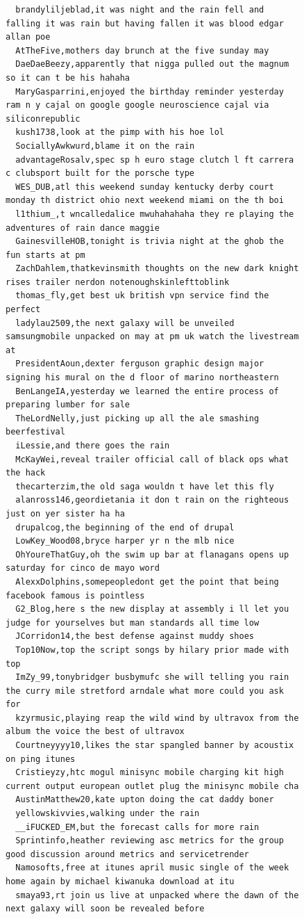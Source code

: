\begin{figure}[htpb]
\begin{verbatim}
  brandyliljeblad,it was night and the rain fell and falling it was rain but having fallen it was blood edgar allan poe
  AtTheFive,mothers day brunch at the five sunday may
  DaeDaeBeezy,apparently that nigga pulled out the magnum so it can t be his hahaha
  MaryGasparrini,enjoyed the birthday reminder yesterday ram n y cajal on google google neuroscience cajal via siliconrepublic
  kush1738,look at the pimp with his hoe lol
  SociallyAwkwurd,blame it on the rain
  advantageRosalv,spec sp h euro stage clutch l ft carrera c clubsport built for the porsche type
  WES_DUB,atl this weekend sunday kentucky derby court monday th district ohio next weekend miami on the th boi
  l1thium_,t wncalledalice mwuhahahaha they re playing the adventures of rain dance maggie
  GainesvilleHOB,tonight is trivia night at the ghob the fun starts at pm
  ZachDahlem,thatkevinsmith thoughts on the new dark knight rises trailer nerdon notenoughskinlefttoblink
  thomas_fly,get best uk british vpn service find the perfect
  ladylau2509,the next galaxy will be unveiled samsungmobile unpacked on may at pm uk watch the livestream at
  PresidentAoun,dexter ferguson graphic design major signing his mural on the d floor of marino northeastern
  BenLangeIA,yesterday we learned the entire process of preparing lumber for sale
  TheLordNelly,just picking up all the ale smashing beerfestival
  iLessie,and there goes the rain
  McKayWei,reveal trailer official call of black ops what the hack
  thecarterzim,the old saga wouldn t have let this fly
  alanross146,geordietania it don t rain on the righteous just on yer sister ha ha
  drupalcog,the beginning of the end of drupal
  LowKey_Wood08,bryce harper yr n the mlb nice
  OhYoureThatGuy,oh the swim up bar at flanagans opens up saturday for cinco de mayo word
  AlexxDolphins,somepeopledont get the point that being facebook famous is pointless
  G2_Blog,here s the new display at assembly i ll let you judge for yourselves but man standards all time low
  JCorridon14,the best defense against muddy shoes
  Top10Now,top the script songs by hilary prior made with top
  ImZy_99,tonybridger busbymufc she will telling you rain the curry mile stretford arndale what more could you ask for
  kzyrmusic,playing reap the wild wind by ultravox from the album the voice the best of ultravox
  Courtneyyyy10,likes the star spangled banner by acoustix on ping itunes
  Cristieyzy,htc mogul minisync mobile charging kit high current output european outlet plug the minisync mobile cha
  AustinMatthew20,kate upton doing the cat daddy boner
  yellowskivvies,walking under the rain
  __iFUCKED_EM,but the forecast calls for more rain
  Sprintinfo,heather reviewing asc metrics for the group good discussion around metrics and servicetrender
  Namosofts,free at itunes april music single of the week home again by michael kiwanuka download at itu
  smaya93,rt join us live at unpacked where the dawn of the next galaxy will soon be revealed before


\end{verbatim}
\end{figure}
